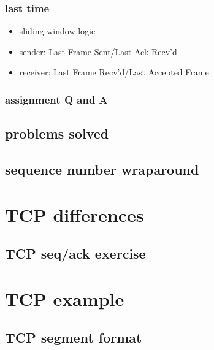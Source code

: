 \date{}
\title{}
\date{}
\usepackage{pgfplots}
\pgfplotsset{compat=1.16}

\begin{frame}
    \titlepage
\end{frame}

\begin{frame}
\frametitle{last time}
\begin{itemize}
\item sliding window logic
\item sender: Last Frame Sent/Last Ack Recv'd
\item receiver: Last Frame Recv'd/Last Accepted Frame
\end{itemize}
\end{frame}

\begin{frame}
\frametitle{assignment Q and A}
\end{frame}

\subsection{problems solved}


\subsection{sequence number wraparound}


\section{TCP differences}


\subsection{TCP seq/ack exercise}


\section{TCP example}

\subsection{TCP segment format}




